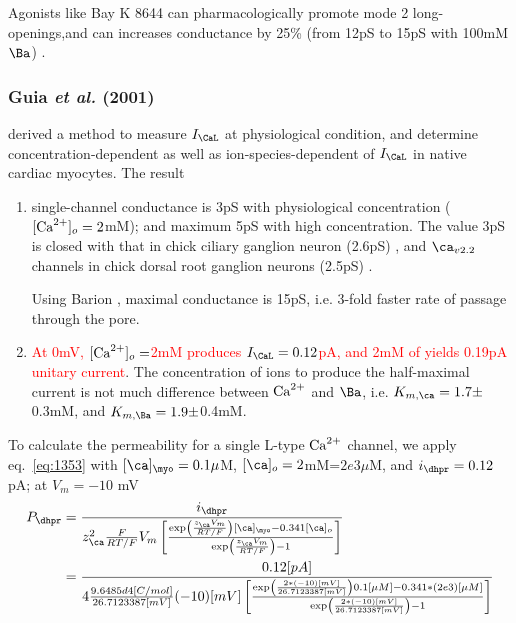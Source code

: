 \begin{framed}
Agonists like Bay K 8644 can pharmacologically promote mode 2
long-openings,and can increases conductance by 25\% (from 12pS to 15pS
with 100mM $\Ba$) \citep{caffrey1986}.
\end{framed}

\subsubsection{Guia {\it et al.} (2001)}
\label{sec:guia-it-et}

\citep{guia2001} derived a method to measure $I_\CaL$ at physiological
condition, and determine concentration-dependent as well as
ion-species-dependent of $I_\CaL$ in native cardiac myocytes. The
result
\begin{enumerate}
\item single-channel conductance is 3pS with physiological
  concentration ($[{\text{Ca}^{2+}}]_o=2$mM); and maximum 5pS with high
  concentration. The value 3pS is closed with that in chick ciliary
  ganglion neuron (2.6pS) \citep{church1996}, and $\ca_{v2.2}$
  channels in chick dorsal root ganglion neurons
  (2.5pS) \citep{weber2009}.

  Using Barion , maximal conductance is 15pS, i.e. 3-fold
  faster rate of passage through the pore.


\item
  \textcolor{red}{At 0mV, $[{\text{Ca}^{2+}}]_o=$2mM produces $I_\CaL=0.12$pA, and
    2mM of  yields 0.19pA unitary current}.
  The concentration of ions to produce the half-maximal current is not
  much difference between ${\text{Ca}^{2+}}$ and $\Ba$, i.e. $K_{m,\ca}=
  1.7\pm$0.3mM, and $K_{m,\Ba}=1.9\pm$0.4mM.
\end{enumerate}

To calculate the permeability for a single L-type ${\text{Ca}^{2+}}$ channel, we
apply eq.~\eqref{eq:1353} with $[\ca]_\myo=0.1\mu$M,
$[\ca]_o=2$mM=$2e3\mu$M, and $i_\dhpr=0.12$pA; at $V_m=-10$ mV
\begin{equation}
  \label{eq:1354}
  \begin{split}
    P_\dhpr &=  \frac{i_\dhpr}{z_\ca ^2 \frac{F}{RT/F}V_m
      \left[\frac{\exp\left(\frac{z_\ca V_m}{RT/F}\right)[\ca]_\myo-0.341[\ca]_o}{\exp\left(\frac{z_\ca V_m}{RT/F}\right)
          - 1} \right]} \\
    &=  \frac{0.12 [pA]}{4 \frac{9.6485d4[C/mol]}{26.7123387[mV]}(-10)[mV]
      \left[\frac{\exp\left(\frac{2*(-10)[mV]}{26.7123387[mV]}\right)0.1[\mu
          M]-0.341*(2e3)[\mu
          M]}{\exp\left(\frac{2*(-10)[mV]}{26.7123387[mV]}\right)
          - 1} \right]}
  \end{split}
\end{equation}

